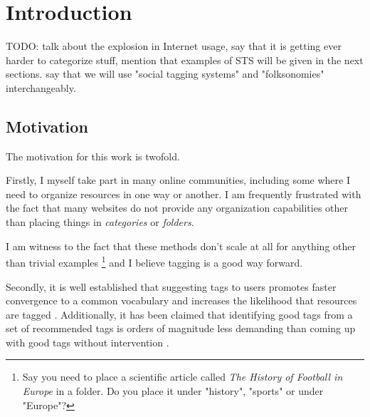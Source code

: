 \chapter{Introduction}\label{chap:intro}

{\color{red} TODO: talk about the explosion in Internet usage, say that it is getting ever harder to categorize stuff, mention that examples of STS will be given in the next sections.
say that we will use "social tagging systems" and "folksonomies" interchangeably. }


\section{Motivation}\label{section:intro_motivation}

The motivation for this work is twofold. 

Firstly, I myself take part in many online communities, including some where I need to organize resources in one way or another. I am frequently frustrated with the fact that many websites do not provide any organization capabilities other than placing things in \textit{categories} or \textit{folders}.

I am witness to the fact that these methods don't scale at all for anything other than trivial examples \footnote{Say you need to place a scientific article called \textit{The History of Football in Europe} in a folder. Do you place it under "history", "sports" or under "Europe"?} and I believe tagging is a good way forward.


Secondly, it is well established that suggesting tags to users promotes faster convergence to a common vocabulary \citep{marlow_etal_2006,hassan_etal_2009, dattolo_etal_2010} and increases the likelihood that resources are tagged \citep{dattolo_etal_2010,floeck_etal_2010}. Additionally, it has been claimed that identifying good tags from a set of recommended tags is orders of magnitude less demanding than coming up with good tags without intervention \citep{marinho_etal_2012}.

